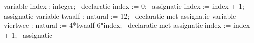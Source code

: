 variable index : integer;                         --declaratie
index := 0;                                       --assignatie
index := index + 1;                               --assignatie
variable twaalf : natural := 12;                  --declaratie met assignatie
variable viertwee : natural := 4*twaalf-6*index;  --declaratie met assignatie
index := index + 1;                               --assignatie